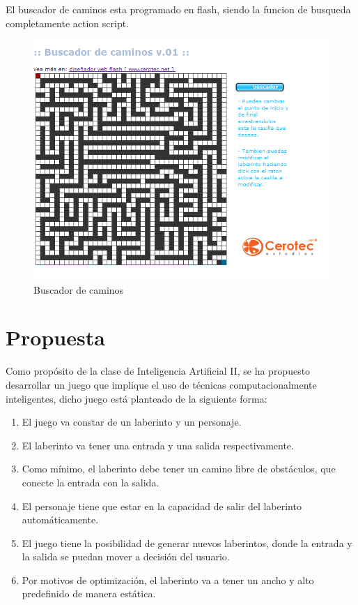 \documentclass{article}%
\begin{document}
El buscador de caminos esta programado en flash, siendo la funcion de busqueda completamente action script.
\begin{figure}[H]
\centering
\includegraphics[width=1\textwidth]{buscador.png}
     \caption{Buscador de caminos}
\end{figure}

\section{Propuesta}
Como prop\'osito de la clase de Inteligencia Artificial II, se ha propuesto desarrollar un juego que implique el uso de t\'ecnicas computacionalmente inteligentes, dicho juego est\'a planteado de la siguiente forma:

\begin{enumerate}
\item El juego va constar de un laberinto y un personaje.
\item El laberinto va tener una entrada y una salida respectivamente.
\item Como m\'inimo, el laberinto debe tener un camino libre de obst\'aculos, que conecte la entrada con la salida.
\item El personaje tiene que estar en la capacidad de salir del laberinto autom\'aticamente.
\item El juego tiene la posibilidad de generar nuevos laberintos, donde la entrada y la salida se puedan mover a decisi\'on del usuario.
\item Por motivos de optimizaci\'on, el laberinto va a tener un ancho y alto predefinido de manera est\'atica.
\end{enumerate}
\end{document}
